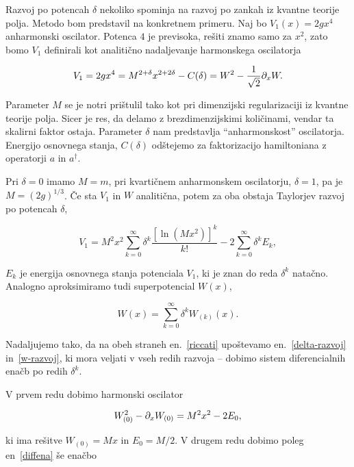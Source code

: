 Razvoj po potencah $\delta$ nekoliko spominja na razvoj po zankah iz kvantne teorije polja. Metodo bom predstavil na konkretnem
primeru. Naj bo $V_1 (x) = 2gx^4$ anharmonski oscilator. Potenca $4$ je previsoka, re\v siti znamo samo za $x^2$, zato bomo
$V_1$ definirali kot analiti\v cno nadaljevanje harmonskega oscilatorja

\begin{equation}
	V_1 = 2gx^4 = M^{2 + \delta}x^{2 + 2\delta} - C(\delta) = W^2 - \frac{1}{\sqrt{2}}\partial_x W.
\end{equation}

Parameter $M$ se je notri pri\v stulil tako kot pri dimenzijski regularizaciji iz kvantne teorije polja. Sicer je res, da delamo
z brezdimenzijskimi koli\v cinami, vendar ta skalirni faktor ostaja. Parameter $\delta$ nam predstavlja "`anharmonskost"' oscilatorja.
Energijo osnovnega stanja, $C(\delta)$ od\v stejemo za faktorizacijo hamiltoniana z operatorji $a$ in $a^\dagger$.

Pri $\delta = 0$ imamo $M = m$, pri kvarti\v cnem anharmonskem oscilatorju, $\delta = 1$, pa je $M = (2g)^{1/3}$. \v Ce sta $V_1$ in
$W$ analiti\v cna, potem za oba obstaja Taylorjev razvoj po potencah $\delta$,

\begin{equation}
	V_1 = M^2x^2\sum_{k = 0}^\infty \delta^k \frac{[\ln(Mx^2)]^k}{k!} - 2 \sum_{k = 0}^\infty \delta^k E_k,
	\label{delta-razvoj}
\end{equation}

$E_k$ je energija osnovnega stanja potenciala $V_1$, ki je znan do reda $\delta^k$ nata\v cno. Analogno aproksimiramo tudi superpotencial
$W(x)$,

\begin{equation}
	W(x) = \sum_{k = 0}^\infty \delta^k W_{(k)}(x).
	\label{w-razvoj}
\end{equation}

Nadaljujemo tako, da na obeh straneh en.~\eqref{riccati} upo\v stevamo en.~\eqref{delta-razvoj} in~\eqref{w-razvoj}, ki mora veljati v
vseh redih razvoja -- dobimo sistem diferencialnih ena\v cb po redih $\delta^k$.

V prvem redu dobimo harmonski oscilator

\begin{equation}
	W_{(0)}^2 - \partial_x W_{(0)} = M^2x^2 - 2E_0,
	\label{diffena}
\end{equation}

ki ima re\v sitve $W_{(0)} = Mx$ in $E_0 = M/2$. V drugem redu dobimo poleg en~\eqref{diffena} \v se ena\v cbo

